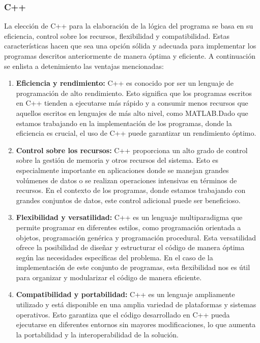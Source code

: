 \documentclass{article}
\begin{document}
        \subsubsection{C++}
            La elección de C++ para la elaboración de la lógica del programa se basa en su eficiencia, control sobre los recursos,
            flexibilidad y compatibilidad. Estas características hacen que sea una opción sólida y adecuada para implementar los
            programas descritos anteriormente de manera óptima y eficiente. A continuación se enlista a detenimiento las ventajas
            mencionadas:
            \begin{enumerate}
                \item \textbf{Eficiencia y rendimiento:} C++ es conocido por ser un lenguaje de programación de alto rendimiento.
                Esto significa que los programas escritos en C++ tienden a ejecutarse más rápido y a consumir menos recursos que aquellos
                escritos en lenguajes de más alto nivel, como MATLAB.\@ Dado que estamos trabajando en la implementación de los programas,
                donde la eficiencia es crucial, el uso de C++ puede garantizar un rendimiento óptimo.

                \item \textbf{Control sobre los recursos:} C++ proporciona un alto grado de control sobre la gestión de memoria y otros
                recursos del sistema. Esto es especialmente importante en aplicaciones donde se manejan grandes volúmenes de datos o se
                realizan operaciones intensivas en términos de recursos. En el contexto de los programas, donde estamos trabajando
                con grandes conjuntos de datos, este control adicional puede ser beneficioso.

                \item \textbf{Flexibilidad y versatilidad:} C++ es un lenguaje multiparadigma que permite programar en diferentes estilos,
                como programación orientada a objetos, programación genérica y programación procedural. Esta versatilidad ofrece la
                posibilidad de diseñar y estructurar el código de manera óptima según las necesidades específicas del problema. En el caso
                de la implementación de este conjunto de programas, esta flexibilidad nos es útil para organizar y modularizar el código
                de manera eficiente.

                \item \textbf{Compatibilidad y portabilidad:} C++ es un lenguaje ampliamente utilizado y está disponible en una amplia
                variedad de plataformas y sistemas operativos. Esto garantiza que el código desarrollado en C++ pueda ejecutarse en
                diferentes entornos sin mayores modificaciones, lo que aumenta la portabilidad y la interoperabilidad de la solución.
            \end{enumerate}
\end{document}
